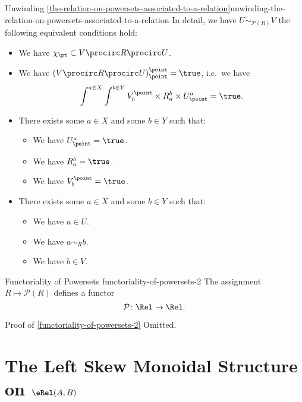 \begin{remark}{Unwinding \cref{the-relation-on-powersets-associated-to-a-relation}}{unwinding-the-relation-on-powersets-associated-to-a-relation}%
    In detail, we have $U\sim_{\mathcal{P}(R)}V$ \textiff the following equivalent conditions hold:
    \begin{itemize}
        \item We have $\chi_{\pt}\subset V\procirc R\procirc U$.
        \item We have $(V\procirc R\procirc U)^{\point}_{\point}=\true$, i.e.\ we have
            \[
                \int^{a\in X}\int^{b\in Y}V^{\point}_{b}\times R^{b}_{a}\times U^{a}_{\point}%
                =%
                \true.%
            \]%
        \item There exists some $a\in X$ and some $b\in Y$ such that:
            \begin{itemize}
                \item We have $U^{a}_{\point}=\true$.
                \item We have $R^{b}_{a}=\true$.
                \item We have $V^{\point}_{b}=\true$.
            \end{itemize}
        \item There exists some $a\in X$ and some $b\in Y$ such that:
            \begin{itemize}
                \item We have $a\in U$.
                \item We have $a\sim_{R}b$.
                \item We have $b\in V$.
            \end{itemize}
    \end{itemize}
\end{remark}
\begin{proposition}{Functoriality of Powersets \rmII}{functoriality-of-powersets-2}%
    The assignment $R\mapsto\mathcal{P}(R)$ defines a functor
    \[
        \mathcal{P}%
        \colon%
        \Rel%
        \to%
        \Rel.
    \]%
\end{proposition}
\begin{Proof}{Proof of \cref{functoriality-of-powersets-2}}%
    Omitted.
\end{Proof}
\section{The Left Skew Monoidal Structure on $\eRel(A,B)$}\label{section-the-left-skew-monoidal-structure-on-rel-a-b}
